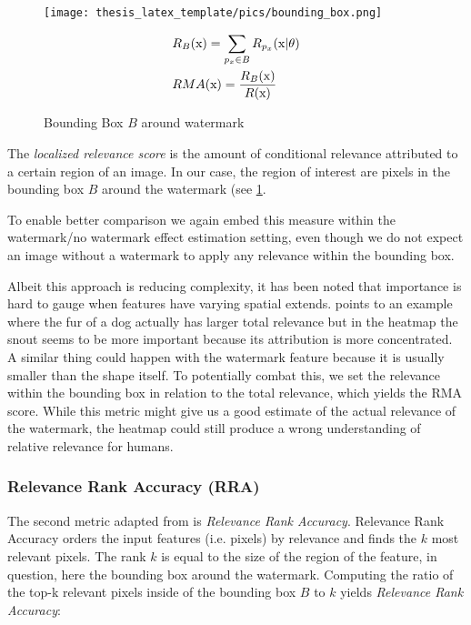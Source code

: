 \begin{figure}
\begin{minipage}[t]{0.45\textwidth}
    \vspace{-\topskip}
        \texttt{[image: thesis\_latex\_template/pics/bounding\_box.png]}
\end{minipage}
\begin{minipage}[t]{0.45\textwidth}
    \begin{align}\displaystyle
    & R_B(\mathrm{x}) = \sum_{p_x \in B} R_{p_x}(\mathrm{x} | \theta)\\
    & RMA(\mathrm{x}) = \frac{R_B(\mathrm{x})}{R(\mathrm{x})}
    \end{align}
\end{minipage}
\caption{Bounding Box $B$ around watermark}
\label{fig:bounding_box}
\end{figure}

The \textit{localized relevance score} is the amount of conditional relevance attributed to a certain region of an image. In our case, the region of interest are pixels in the bounding box $B$ around the watermark (see \cref{fig:bounding_box}. 

To enable better comparison we again embed this measure within the watermark/no watermark effect estimation setting, even though we do not expect an image without a watermark to apply any relevance within the bounding box.

Albeit this approach is reducing complexity, it has been noted that importance is hard to gauge when features have varying spatial extends. \cite{Achtibat2022} points to an example where the fur of a dog actually has larger total relevance but in the heatmap the snout seems to be more important because its attribution is more concentrated. A similar thing could happen with the watermark feature because it is usually smaller than the shape itself. 
To potentially combat this, we set the relevance within the bounding box in relation to the total relevance, which yields the RMA score.
While this metric might give us a good estimate of the actual relevance of the watermark, the heatmap could still produce a wrong understanding of relative relevance for humans. \\

\subsubsection{Relevance Rank Accuracy (RRA)}
The second metric adapted from \cite{Arras2022} is \textit{Relevance Rank Accuracy}.  
Relevance Rank Accuracy orders the input features (i.e. pixels) by relevance and finds the $k$ most relevant pixels. The rank $k$ is equal to the size of the region of the feature, in question, here the bounding box around the watermark. Computing the ratio of the top-k relevant pixels inside of the bounding box $B$ to $k$ yields \textit{Relevance Rank Accuracy}:

